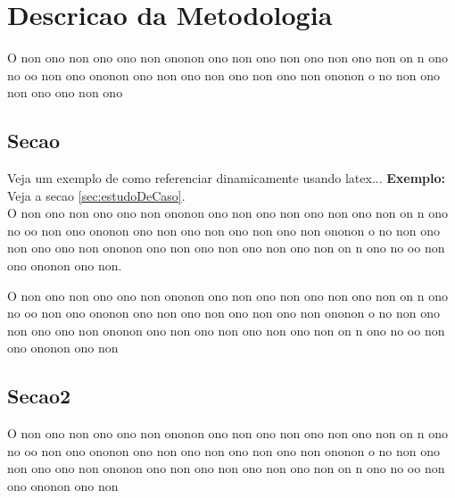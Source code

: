 \chapter{Descricao da Metodologia}
\label{ref:metodologia}

O non ono non ono ono non ononon ono non ono non ono non ono non on
n ono no oo non ono ononon ono  non ono non ono non ono non ononon o 
no non ono non ono ono non ono

\section{Secao}
Veja um exemplo de como referenciar dinamicamente usando latex...
{\bf Exemplo:} Veja a secao \ref{sec:estudoDeCaso}. \\
O non ono non ono ono non ononon ono non ono non ono non ono non on
n ono no oo non ono ononon ono  non ono non ono non ono non ononon o 
no non ono non ono ono non ononon ono non ono non ono non ono non on
n ono no oo non ono ononon ono  non.

O non ono non ono ono non ononon ono non ono non ono non ono non on
n ono no oo non ono ononon ono  non ono non ono non ono non ononon o 
no non ono non ono ono non ononon ono non ono non ono non ono non on
n ono no oo non ono ononon ono  non

\section{Secao2}
\label{sec:sessao}
O non ono non ono ono non ononon ono non ono non ono non ono non on
n ono no oo non ono ononon ono  non ono non ono non ono non ononon o 
no non ono non ono ono non ononon ono non ono non ono non ono non on
n ono no oo non ono ononon ono  non
